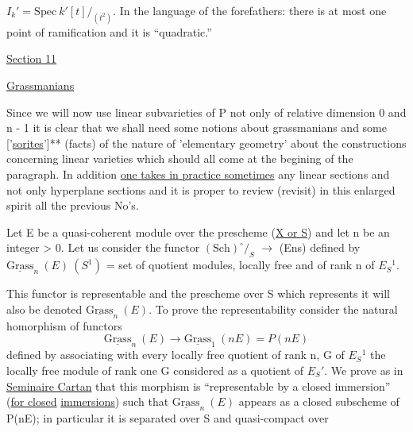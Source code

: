 
$I_k{}' = \mathrm{Spec}\ k'[t]/_{(t^2)}$.  In the language of the forefathers:  there
is at most one point of ramification and it is ``quadratic.''

\uline{Section 11}

\uline{Grassmanians}

Since we will now use linear subvarieties of P not only of
relative dimension 0 and n - 1 it is clear that we shall need some
notions about grassmanians and some ['\uline{sorites}']** (facts) of the
nature of 'elementary geometry' about the constructions concerning
linear varieties which should all come at the begining of the
paragraph.  In addition \uline{one takes in practice sometimes} any linear
sections and not only hyperplane sections and it is proper to
review (revisit) in this enlarged spirit all the previous No's.

Let E be a quasi-coherent module over the prescheme (\uline{X or S})
and let n be an integer > 0.  Let us consider the functor $(\mathrm{Sch})^{\circ}/_S$
$\rightarrow$ (Ens) defined by $\underline{\mathrm{Grass}}_n\ (E)\ (S^1)$ = set of quotient modules,
locally free and of rank n of $E_S{}^1$.

This functor is representable and the prescheme over S which
represents it will also be denoted $\underline{\mathrm{Grass}}_n\ (E)$.  To prove the
representability consider the natural homorphism of functors
\[ \underline{\mathrm{Grass}}_n\ (E) \rightarrow \underline{\mathrm{Grass}}_1\ (nE) = P(nE) \]
defined by associating with every locally free quotient of rank n,
G of $E_S{}^1$ the locally free module of rank one G considered as a
quotient of $E_S{}'$.  We prove as in \uline{Seminaire Cartan} that this
morphism is ``representable by a closed immersion'' (\uline{for closed}
\uline{immersions}) such that $\underline{\mathrm{Grass}}_n\ (E)$ appears as a closed subscheme of
P(nE); in particular it is separated over S and quasi-compact over

